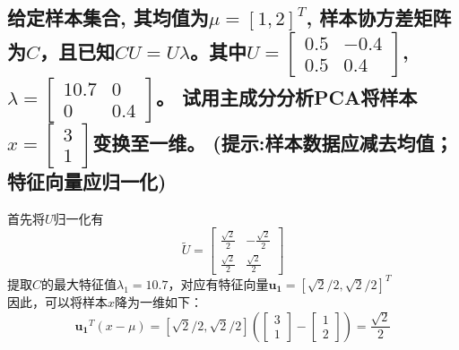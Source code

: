 \documentclass[a4paper]{article}
\begin{document}
\subsection{给定样本集合, 其均值为$\mu=[1, 2]^T$, 样本协方差矩阵为$C$，且已知$CU=U\lambda$。\newline 其中$U=\left[ \begin{array}{cc}
    0.5 & -0.4 \\
    0.5 & 0.4
\end{array} \right]$, $\lambda=\left[ \begin{array}{cc}
    10.7 & 0 \\
    0 & 0.4
\end{array} \right]$。\newline
试用主成分分析PCA将样本$x=\left[ \begin{array}{c}
    3 \\
    1
\end{array} \right]$变换至一维。\newline
(提示:样本数据应减去均值；特征向量应归一化) \\
}
首先将$ U $归一化有
$$ \widetilde{U} = \left[ \begin{array}{cc}
    \frac{\sqrt{2}}{2} & -\frac{\sqrt{2}}{2} \\
    \frac{\sqrt{2}}{2} & \frac{\sqrt{2}}{2}
\end{array} \right] $$
提取$ C $的最大特征值$ \lambda_1 = 10.7 $，对应有特征向量$ \mathbf{u_1} = \left[ \sqrt{2}/2, \sqrt{2}/2 \right]^T $\\
因此，可以将样本$ x $降为一维如下：
$$ \mathbf{u_1}^T (x - \mu) = \left[ \sqrt{2}/2, \sqrt{2}/2 \right] \left( \left[ \begin{array}{c}
    3 \\
    1
\end{array} \right] - \left[ \begin{array}{c}
    1 \\
    2
\end{array} \right] \right) = \frac{\sqrt{2}}{2} $$
\end{document}
